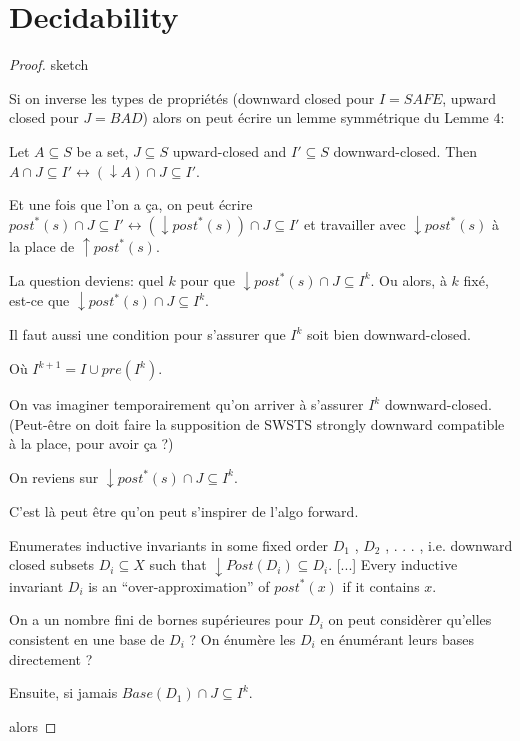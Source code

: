 
\section{Decidability}

\begin{proof}{sketch}


Si on inverse les types de propriétés (downward closed pour $I = SAFE$, upward closed pour $J= BAD$) alors on peut écrire un lemme symmétrique du Lemme $4$:

\begin{lemma}
Let $A \subseteq S$ be a set, $J \subseteq S$ upward-closed and $I' \subseteq S$ downward-closed. 
Then $A \cap J \subseteq I' \leftrightarrow (\downarrow  A) \cap J \subseteq I'$.
\end{lemma}

Et une fois que l'on a ça, on peut écrire
$ post^*(s)\cap J \subseteq I' \leftrightarrow (\downarrow  post^*(s)) \cap J \subseteq I'$ 
et travailler avec $\downarrow post^*(s)$ à la place de $\uparrow post^*(s)$.

La question deviens: quel $k$ pour que
$\downarrow post^*(s) \cap J \subseteq I^k$.
Ou alors, à $k$ fixé, est-ce que
$\downarrow post^*(s) \cap J \subseteq I^k$.

Il faut aussi une condition pour s'assurer que $I^k$ soit bien downward-closed.

Où
$I^{k+1} = I \cup pre(I^k )$.

On vas imaginer temporairement qu'on arriver à s'assurer $I^k$ downward-closed. 
(Peut-être on doit faire la supposition de SWSTS strongly downward compatible à la place, pour avoir ça ?)

On reviens sur $\downarrow post^*(s) \cap J \subseteq I^k$.

C'est là peut être qu'on peut s'inspirer de l'algo forward.

Enumerates inductive invariants in some fixed order $D_1$ , $D_2$ , . . . , i.e. downward closed subsets $D_i \subseteq X$ such that $\downarrow Post(D_i ) \subseteq D_i$. [...]
Every inductive invariant $D_i$ is an “over-approximation” of $post^*(x)$ if it contains $x$.

On a un nombre fini de bornes supérieures pour $D_i$ on peut considèrer qu’elles consistent en une base de $D_i$ ? On énumère les $D_i$ en énumérant leurs bases directement ?

Ensuite, si jamais	$Base(D_1)  \cap J \subseteq I^k$.

alors


\end{proof}
